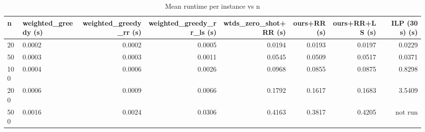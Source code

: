 \begin{table}[t]
\centering
\small
\caption{Mean runtime per instance vs n}
\begin{tabular}{llrrrrrr}
\toprule
n & weighted\_greedy (s) & weighted\_greedy\_rr (s) & weighted\_greedy\_rr\_ls (s) & wtds\_zero\_shot+RR (s) & ours+RR (s) & ours+RR+LS (s) & ILP (30 s) (s) \\
\midrule
20 & 0.0002 & 0.0002 & 0.0005 & 0.0194 & 0.0193 & 0.0197 & 0.0229 \\
50 & 0.0003 & 0.0003 & 0.0011 & 0.0545 & 0.0509 & 0.0517 & 0.0371 \\
100 & 0.0004 & 0.0006 & 0.0026 & 0.0968 & 0.0855 & 0.0875 & 0.8298 \\
200 & 0.0006 & 0.0009 & 0.0066 & 0.1792 & 0.1617 & 0.1683 & 3.5409 \\
500 & 0.0016 & 0.0024 & 0.0306 & 0.4163 & 0.3817 & 0.4205 & not run \\
\bottomrule
\end{tabular}
\end{table}
